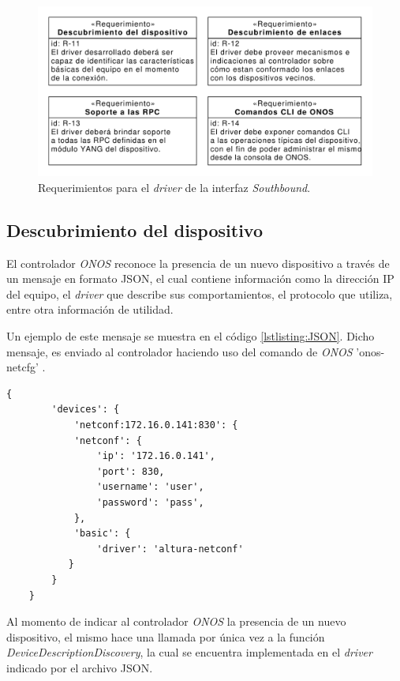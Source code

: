   \begin{figure}[H]
    \centering
    \includegraphics[scale=0.65]{Figures/req_driver.pdf}
    \caption{Requerimientos para el \textit{driver} de la interfaz \textit{Southbound}.}
    \label{fig:req_driver}
  \end{figure}

  \subsection{Descubrimiento del dispositivo} \label{driverr}
  El controlador \textit{ONOS} reconoce la presencia de un nuevo dispositivo a través de un mensaje en formato JSON, el cual contiene información como la dirección IP del equipo, el \textit{driver} que describe sus comportamientos, el protocolo que utiliza, entre otra información de utilidad. 
  
  Un ejemplo de este mensaje se muestra en el código \ref{lstlisting:JSON}. Dicho mensaje, es enviado al controlador haciendo uso del comando de \textit{ONOS} 'onos-netcfg' \parencite{onosconfserv}.

  \begin{lstlisting}[language=SHELXL, caption=Mensaje JSON con información del dispositivo., label=lstlisting:JSON]
    {
        'devices': {
            'netconf:172.16.0.141:830': {
            'netconf': {
                'ip': '172.16.0.141',
                'port': 830,
                'username': 'user',
                'password': 'pass',
            },
            'basic': {
                'driver': 'altura-netconf'
           }
        }
    }
    \end{lstlisting}


    Al momento de indicar al controlador \textit{ONOS} la presencia de un nuevo dispositivo, el mismo hace una llamada por única vez a la función \textit{DeviceDescriptionDiscovery}, la cual se encuentra implementada en el \textit{driver} indicado por el archivo JSON. 

